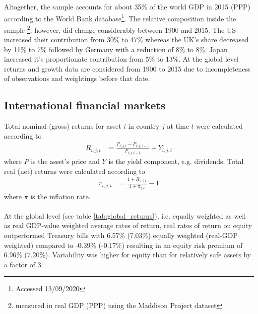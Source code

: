 Altogether, the sample accounts for about 35\% of the world GDP in 2015 (PPP) according to the World Bank database\footnote{Accessed 13/09/2020}. The relative composition inside the sample \footnote{measured in real GDP (PPP) using the Maddison Project dataset}, however, did change considerably between 1900 and 2015. The US increased their contribution from 30\% to 47\% whereas the UK's share decreased by 11\% to 7\% followed by Germany with a reduction of 8\% to 8\%. Japan increased it's proportionate contribution from 5\% to 13\%. At the global level returns and growth data are considered from 1900 to 2015 due to incompleteness of observations and weightings before that date.

\subsection{International financial markets}
Total nominal (gross) returns for asset $i$ in country $j$ at time $t$ were calculated according to
\begin{align*}
    R_{i,j,t} &= \frac{P_{i,j,t} - P_{i,j,t-1}}{P_{i,j,t-1}} + Y_{i,j,t}
\end{align*}
where $P$ is the asset's price and $Y$ is the yield component, e.g. dividends. Total real (net) returns were calculated according to
\begin{align*}
    r_{i,j,t} &= \frac{1+R_{i,j,t}}{1+\pi_{j,t}} - 1
\end{align*}
where $\pi$ is the inflation rate.\\
\\
At the global level (see table \ref{tab:global_returns}), i.e. equally weighted as well as real GDP-value weighted average rates of return, real rates of return on equity outperformed Treasury bills with 6.57\% (7.03\%) equally weighted (real-GDP weighted) compared to -0.39\% (-0.17\%) resulting in an equity risk premium of 6.96\% (7.20\%). Variability was higher for equity than for relatively safe assets by a factor of 3.

